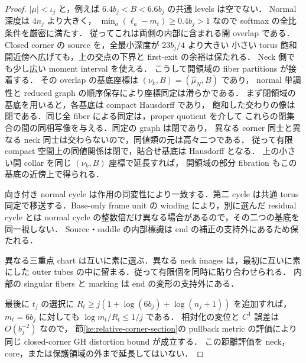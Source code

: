 \begin{proof}
$|\mu|<\iota_j$ と，例えば $6.4b_j<B<6.6b_j$ の共通 levels は空でない．
Normal 深度は $4n_j$ より大きく，
$\min_a(\ell_a-m_t)\ge0.4b_j>1$ なので softmax の全比条件を厳密に満たす．
従ってこれは両側の内部に含まれる開 overlap である．
Closed corner の source を，全最小深度が $23b_j/4$ より大きい
小さい torus 飽和開近傍へ広げても，上の交点の下界と first-exit の余裕は保たれる．
Neck 側でも少し広い moment interval を使える．
こうして開領域の fiber partitions が接着する．
その overlap の基底座標は $(\nu_k,B)=(\widehat\mu_N,B)$ であり，
normal 単調性と reduced graph の順序保存により座標同定は滑らかである．
まず閉領域の基底を用いると，各基底は compact Hausdorff であり，
飽和した交わりの像は閉である．同じ全 fiber による同定は，proper quotient を介して
これらの閉集合の間の同相写像を与える．同定の graph は閉であり，
異なる corner 同士と異なる neck 同士は交わらないので，同値類の元は高々二つである．
従って有限 compact 空間上の同値関係は閉で，貼合せ基底は Hausdorff となる．
上の小さい開 collar を同じ $(\nu_k,B)$ 座標で延長すれば，
開領域の部分 fibration もこの基底の近傍上で得られる．

向き付き normal cycle は作用の同変性により一致する．第二 cycle は共通 torus
同定で移送する．Base-only frame unit の winding により，別に選んだ residual cycle
とは normal cycle の整数倍だけ異なる場合があるので，その二つの基底を同一視しない．
Source・saddle の内部標識は end の補正の支持外にあるため保たれる．

異なる三重点 chart は互いに素に選ぶ．異なる neck images は，最初に互いに素にした
outer tubes の中に留まる．従って有限個を同時に貼り合わせられる．
内部の singular fibers と marking は end の変形の支持外にある．

最後に $t_j$ の選択に
$R_t\ge j(1+\log(6b_j)+\log(n_j+1))$ を追加すれば，
$m_t=6b_j$ に対しても $\log m_t/R_t\le1/j$ である．
相対化の変位と $C^1$ 誤差は $O(b_j^{-2})$ なので，
節\ref{ke:relative-corner-section}の pullback metric の評価により
同じ closed-corner GH distortion bound が成立する．
この距離評価を neck，core，または保護領域の外まで延長してはいない．
\end{proof}
